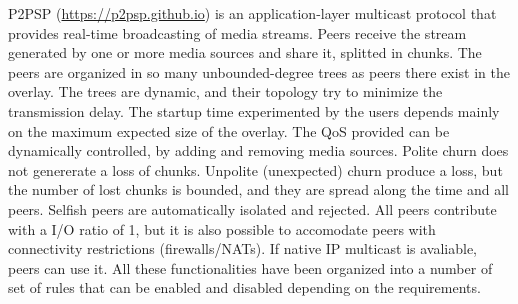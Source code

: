 

P2PSP (\url{https://p2psp.github.io}) is an application-layer
multicast protocol that provides real-time broadcasting of media
streams. Peers receive the stream generated by one or more media
sources and share it, splitted in chunks. The peers are organized in
so many unbounded-degree trees as peers there exist in the
overlay. The trees are dynamic, and their topology try to minimize the
transmission delay. The startup time experimented by the users depends
mainly on the maximum expected size of the overlay. The QoS provided
can be dynamically controlled, by adding and removing media
sources. Polite churn does not genererate a loss of chunks. Unpolite
(unexpected) churn produce a loss, but the number of lost chunks is
bounded, and they are spread along the time and all peers. Selfish
peers are automatically isolated and rejected. All peers contribute
with a I/O ratio of 1, but it is also possible to accomodate peers
with connectivity restrictions (firewalls/NATs). If native IP
multicast is avaliable, peers can use it. All these functionalities
have been organized into a number of set of rules that can be enabled
and disabled depending on the requirements.

